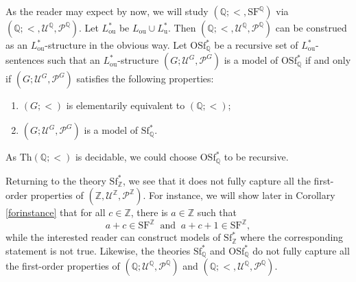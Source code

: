 \documentclass[letterpaper]{amsart}
\newcommand{\qq}{\mathbb{Q}}
\newcommand{\nn}{\mathbb{N}}
\newcommand{\zz}{\mathbb{Z}}
\newcommand{\sU}{\mathscr{U}}
\newcommand{\sP}{\mathscr{P}}
\newcommand{\SF}{\mathrm{SF}^\zz}
\newcommand{\SQ}{\mathrm{SF}^\qq}
\newcommand{\WSFZ}{\mathrm{Sf}^*_{\zz}}
\newcommand{\WSFQ}{\mathrm{Sf}^*_{\qq}}
\newcommand{\WOSFQ}{\mathrm{OSf}^*_{\qq}}
\begin{document}
\noindent  As the reader may expect by now, we will study $(\qq; <, \SQ)$ via $(\qq; <, \sU^\qq, \sP^\qq)$. Let $L_\mathrm{ou}^*$ be $L_\mathrm{ou} \cup L_\mathrm{u}^*$.  Then $(\qq; <, \sU^\qq, \sP^\qq)$ can be construed as an  $L_\mathrm{ou}^*$-structure in the obvious way. Let $\WOSFQ$ be a recursive set of $L_\mathrm{ou}^*$-sentences such that an $L_\mathrm{ou}^*$-structure $(G; \sU^G, \sP^G)$ is a model of $\WOSFQ$ if and only if $(G; \sU^G, \sP^G)$   satisfies the following properties:
\begin{enumerate}
\item $(G; <)$ is elementarily equivalent to $(\qq;<)$;
\item $(G; \sU^G, \sP^G)$ is a model of $\WSFQ$.
\end{enumerate}
As $\text{Th}(\qq;<)$ is decidable, we could choose $\WOSFQ$ to be recursive.

\medskip\noindent Returning to the theory $\WSFZ$, we see that it does not fully capture all the first-order properties of $(\zz, \sU^\zz, \sP^\zz)$. For instance, we will show later in Corollary \ref{forinstance} that for all $c \in \zz$, there is $a \in \zz$ such that 
$$ a+c \in \SF\  \text{ and }\  a+c+1 \in \SF, $$
while the interested reader can construct models of $\WSFZ$ where the corresponding statement is not true. Likewise, the theories $\WSFQ$ and $\WOSFQ$ do not fully capture all the first-order properties of $(\qq; \sU^\qq, \sP^\qq)$ and $(\qq; <, \sU^\qq, \sP^\qq)$.
 
\begin{comment}
For any given $n$, $(G; 1, P) \models T_1^{-}$, and $a \in G^m$, we denote by $[a]_n$ the image of $a$ in $(G \slash nG)^m$. 
For given $p$, $l \in \nn$, $k \in \zz^m$ and $r \in \{ 0, \ldots, p^l-1\}$, the {\bf $p^l$-congruent equation corresponding to $(k, r)$} with variables in $x$ is a formula $\varphi \in L_1(x)$  such that in any $(G; 1, P) \models T^{-}_1$,  
$$  \varphi(a)\  \text{ if and only if }\  [k\cdot a]_{p^l} = [r]_{p^l} \quad \text{for all } a \in G^m.  $$
It is easy to see that for any choice of $p$, $l$, $k$ and $r$ as above, a $p^l$-congruent equation corresponding to $(k, r)$ exists and is unique up to equivalence across models of $T_1^-$. Furthermore, for any $p^l$-congruent equation $\varphi \in L(x)$, $(G; 1, P)\models T^{-}_1$, the truth value of $\varphi(a)$ depends only on $[a]_{p^l}$.
\end{comment}
\end{document}
